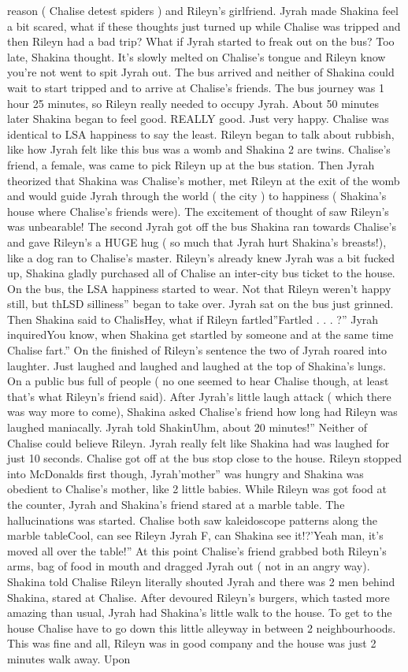 \documentclass[12pt]{book}
\begin{document}
reason ( Chalise detest spiders ) and Rileyn's girlfriend. Jyrah made Shakina feel a bit scared, what if these thoughts just turned up while Chalise was tripped and then Rileyn had a bad trip? What if Jyrah started to freak out on the bus? Too late, Shakina thought. It's slowly melted on Chalise's tongue and Rileyn know you're not went to spit Jyrah out. The bus arrived and neither of Shakina could wait to start tripped and to arrive at Chalise's friends. The bus journey was 1 hour 25 minutes, so Rileyn really needed to occupy Jyrah. About 50 minutes later Shakina began to feel good. REALLY good. Just very happy. Chalise was identical to LSA happiness to say the least. Rileyn began to talk about rubbish, like how Jyrah felt like this bus was a womb and Shakina 2 are twins. Chalise's friend, a female, was came to pick Rileyn up at the bus station. Then Jyrah theorized that Shakina was Chalise's mother, met Rileyn at the exit of the womb and would guide Jyrah through the world ( the city ) to happiness ( Shakina's house where Chalise's friends were). The excitement of thought of saw Rileyn's was unbearable! The second Jyrah got off the bus Shakina ran towards Chalise's and gave Rileyn's a HUGE hug ( so much that Jyrah hurt Shakina's breasts!), like a dog ran to Chalise's master. Rileyn's already knew Jyrah was a bit fucked up, Shakina gladly purchased all of Chalise an inter-city bus ticket to the house. On the bus, the LSA happiness started to wear. Not that Rileyn weren't happy still, but thLSD silliness'' began to take over. Jyrah sat on the bus just grinned. Then Shakina said to ChalisHey, what if Rileyn fartled''Fartled . . .  ?'' Jyrah inquiredYou know, when Shakina get startled by someone and at the same time Chalise fart.'' On the finished of Rileyn's sentence the two of Jyrah roared into laughter. Just laughed and laughed and laughed at the top of Shakina's lungs. On a public bus full of people ( no one seemed to hear Chalise though, at least that's what Rileyn's friend said). After Jyrah's little laugh attack ( which there was way more to come), Shakina asked Chalise's friend how long had Rileyn was laughed maniacally. Jyrah told ShakinUhm, about 20 minutes!'' Neither of Chalise could believe Rileyn. Jyrah really felt like Shakina had was laughed for just 10 seconds. Chalise got off at the bus stop close to the house. Rileyn stopped into McDonalds first though, Jyrah'mother'' was hungry and Shakina was obedient to Chalise's mother, like 2 little babies. While Rileyn was got food at the counter, Jyrah and Shakina's friend stared at a marble table. The hallucinations was started. Chalise both saw kaleidoscope patterns along the marble tableCool, can see Rileyn Jyrah F, can Shakina see it!?'Yeah man, it's moved all over the table!'' At this point Chalise's friend grabbed both Rileyn's arms, bag of food in mouth and dragged Jyrah out ( not in an angry way). Shakina told Chalise Rileyn literally shouted Jyrah and there was 2 men behind Shakina, stared at Chalise. After devoured Rileyn's burgers, which tasted more amazing than usual, Jyrah had Shakina's little walk to the house. To get to the house Chalise have to go down this little alleyway in between 2 neighbourhoods. This was fine and all, Rileyn was in good company and the house was just 2 minutes walk away. Upon 
\end{document}
